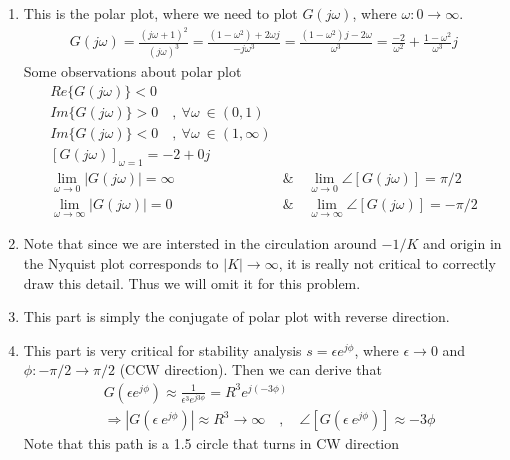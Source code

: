 \documentclass[twoside]{article}
\begin{document}
\begin{enumerate}
  \item This is the polar plot, where we need to plot $G(j \omega)$, where $\omega : 0 \to
    \infty$. 
    \begin{align*}
      G(j \omega) = \frac{(j\omega + 1)^2 }{(j \omega)^3} 
      = \frac{ (1 - \omega^2) + 2 \omega j}{ -j \omega^3}
     = \frac{ (1 - \omega^2) j - 2 \omega}{\omega^3}
       = \frac{- 2 }{\omega^2} + \frac{ 1 - \omega^2 }{\omega^3} j
    \end{align*}
%
   Some observations about polar plot
    \begin{align*}
       Re \lbrace G(j \omega) \rbrace < 0 
      \\ 
       Im \lbrace G(j \omega) \rbrace > 0 \quad , \ \forall  \omega \ \in
      (0, 1) 
      \\
       Im \lbrace G(j \omega) \rbrace < 0 \quad , \ \forall  \omega \ \in
      (1,\infty) 
      \\
      [ G(j \omega) ]_{\omega = 1} = -2 + 0 j
      \\
        \lim_{\omega \to 0}  | G(j \omega)  | = \infty
       \quad & \& \quad
       \lim_{\omega \to 0} \angle [ G(j \omega) ] = \pi/2  
        \\
       \lim_{\omega \to \infty} | G(j \omega) | = 0
        \quad & \& \quad
      \lim_{\omega \to \infty} \angle [ G(j \omega) ] = -\pi/2
      \end{align*}
  \item Note that since we are intersted in the circulation around
    $-1/K$ and origin in the Nyquist plot corresponds to $| K | \to
    \infty$, it is really not critical to correctly draw this detail. 
    Thus we will omit it for this problem.
   \item This part is simply the conjugate of polar plot with reverse
     direction. 
  \item This part is very critical for stability analysis
     $s = \epsilon e^{j \phi}$, where $\epsilon \to 0$ and $\phi :
     -\pi/2 \to \pi/2$ (CCW direction).  Then  we can derive that  
   \begin{align*}
     & G \left( \epsilon e^{j \phi} \right) \approx \frac{1}{\epsilon^3 e^{j
        3\phi}} = R^3 e^{j (-3 \phi)}
       \\
    &\Rightarrow | G \left(\epsilon \ e^{j \phi} \right) | \approx
     R^3 \to \infty 
   \quad , \quad \angle [ G \left( \epsilon \ e^{j \phi} \right) ]
      \approx -3 \phi
   \end{align*}
  Note that this path is a 1.5 circle that turns in CW direction
\end{enumerate}
\end{document}
